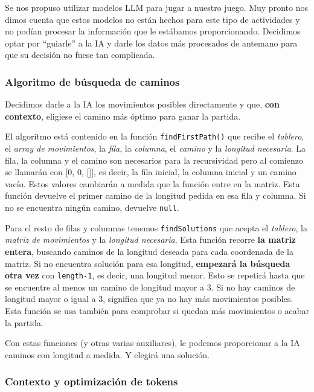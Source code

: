 \documentclass[12pt,epsf,titlepage,a4paper]{article}
\begin{document}
Se nos propuso utilizar modelos LLM para jugar a nuestro juego. Muy pronto nos dimos cuenta que estos modelos no están hechos para este tipo de actividades y no podían procesar la información que le estábamos proporcionando. Decidimos optar por “guiarle” a la IA y darle los datos más procesados de antemano para que su decisión no fuese tan complicada.

\subsubsection{Algoritmo de búsqueda de caminos}

Decidimos darle a la IA los movimientos posibles directamente y que, \textbf{con contexto}, eligiese el camino más óptimo para ganar la partida. 

El algoritmo está contenido en la función \texttt{findFirstPath()} que recibe el \textit{tablero}, el \textit{array de movimientos}, la \textit{fila}, la \textit{columna}, el \textit{camino} y la \textit{longitud necesaria}. La fila, la columna y el camino son necesarios para la recursividad pero al comienzo se llamarán con [0, 0, []], es decir, la fila inicial, la columna inicial y un camino vacío. Estos valores cambiarán a medida que la función entre en la matriz. Esta función devuelve el primer camino de la longitud pedida en esa fila y columna. Si no se encuentra ningún camino, devuelve \texttt{null}.

Para el resto de filas y columnas tenemos \texttt{findSolutions} que acepta el \textit{tablero}, la \textit{matriz de movimientos} y la \textit{longitud necesaria}. Esta función recorre \textbf{la matriz entera}, buscando caminos de la longitud deseada para cada coordenada de la matriz. Si no encuentra solución para esa longitud, \textbf{empezará la búsqueda otra vez} con \texttt{length-1}, es decir, una longitud menor. Esto se repetirá hasta que se encuentre al menos un camino de longitud mayor a 3. Si no hay caminos de longitud mayor o igual a 3, significa que ya no hay más movimientos posibles. Esta función se usa también para comprobar si quedan más movimientos o acabar la partida.

Con estas funciones (y otras varias auxiliares), le podemos proporcionar a la IA caminos con longitud a medida. Y elegirá una solución.

\subsubsection{Contexto y optimización de tokens}
\end{document}
